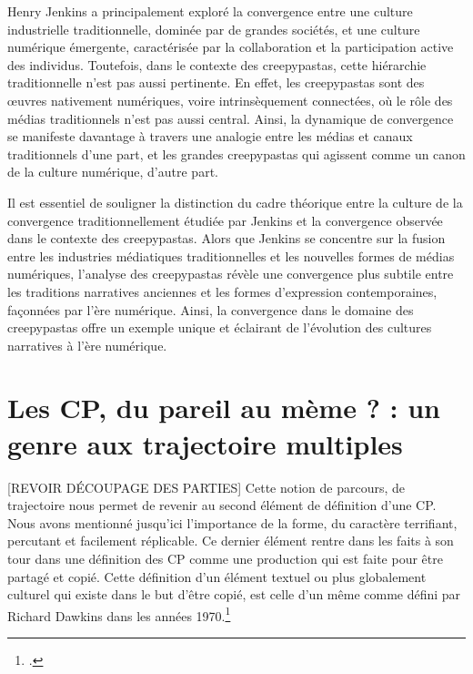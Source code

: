 \documentclass[12pt,a4paper,oneside,titlepage]{book} %
\begin{document}
Henry Jenkins a principalement exploré la convergence entre une culture industrielle traditionnelle, dominée par de grandes sociétés, et une culture numérique émergente, caractérisée par la collaboration et la participation active des individus. Toutefois, dans le contexte des creepypastas, cette hiérarchie traditionnelle n'est pas aussi pertinente. En effet, les creepypastas sont des œuvres nativement numériques, voire intrinsèquement connectées, où le rôle des médias traditionnels n'est pas aussi central. Ainsi, la dynamique de convergence se manifeste davantage à travers une analogie entre les médias et canaux traditionnels d'une part, et les grandes creepypastas qui agissent comme un canon de la culture numérique, d'autre part.

Il est essentiel de souligner la distinction du cadre théorique entre la culture de la convergence traditionnellement étudiée par Jenkins et la convergence observée dans le contexte des creepypastas. Alors que Jenkins se concentre sur la fusion entre les industries médiatiques traditionnelles et les nouvelles formes de médias numériques, l'analyse des creepypastas révèle une convergence plus subtile entre les traditions narratives anciennes et les formes d'expression contemporaines, façonnées par l'ère numérique. Ainsi, la convergence dans le domaine des creepypastas offre un exemple unique et éclairant de l'évolution des cultures narratives à l'ère numérique.



\chapter[Les CP : du pareil au mème ? ]{Les CP, du pareil au mème ?  :  un genre aux trajectoire multiples}

	[REVOIR DÉCOUPAGE DES PARTIES]
	Cette notion de parcours, de trajectoire nous permet de revenir au second élément de définition d’une CP. Nous avons mentionné jusqu’ici l’importance de la forme, du caractère terrifiant, percutant et facilement réplicable. Ce dernier élément rentre dans les faits à son tour dans une définition des CP comme une production qui est faite pour être partagé et copié. Cette définition d’un élément textuel ou plus globalement culturel qui existe dans le but d’être copié, est celle d’un même comme défini par Richard Dawkins dans les années 1970.\footcite{dawkins_gene_2003}
	
\end{document}
